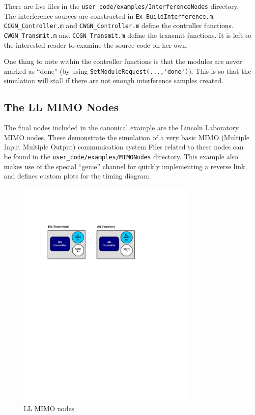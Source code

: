 There are five files in the \verb+user_code/examples/InterferenceNodes+
directory. The interference sources are constructed in
\verb+Ex_BuildInterference.m+.  \verb+CCGN_Controller.m+ and
\verb+CWGN_Controller.m+ define the controller functions.
\verb+CWGN_Transmit.m+ and \verb+CCGN_Transmit.m+ define the
transmit functions. It is left to the interested reader to examine
the source code on her own.

One thing to note within the controller functions is that the
modules are never marked as ``done'' (by using
\verb+SetModuleRequest(...,'done')+). This is so that the simulation
will stall if there are not enough interference samples created.

\subsection{The LL MIMO Nodes}\label{sec:llmimoNodes}

The final nodes included in the canonical example are the Lincoln
Laboratory MIMO nodes.  These demonstrate the simulation of a very
basic MIMO (Multiple Input Multiple Output) communication system
Files related to these nodes can be found in the 
\verb+user_code/examples/MIMONodes+ directory.
This example also makes use of the special ``genie'' channel for
quickly implementing a reverse link, and defines custom plots for
the timing diagram.

\begin{figure}[h]
\centering
\includegraphics[width=3.5in]{figs/LL_MIMO_Example}
\caption{LL MIMO nodes} \label{fig:llmimoNodes}
\end{figure}

